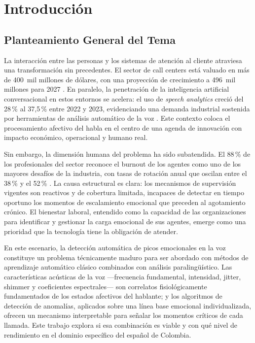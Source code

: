 \section{Introducción}
\label{sec:introduccion}

\subsection{Planteamiento General del Tema}
\label{sec:intro_planteamiento}

La interacción entre las personas y los sistemas de atención al cliente atraviesa una
transformación sin precedentes. El sector de call centers está valuado en más de
400~mil millones de dólares, con una proyección de crecimiento a 496~mil millones para
2027 \cite{zoom2025}. En paralelo, la penetración de la inteligencia artificial
conversacional en estos entornos se acelera: el uso de \textit{speech analytics}
creció del 28\,\% al 37{,}5\,\% entre 2022 y 2023, evidenciando una demanda industrial
sostenida por herramientas de análisis automático de la voz \cite{zoom2025}. Este
contexto coloca el procesamiento afectivo del habla en el centro de una agenda de
innovación con impacto económico, operacional y humano real.

Sin embargo, la dimensión humana del problema ha sido subatendida. El 88\,\% de los
profesionales del sector reconoce el burnout de los agentes como uno de los mayores
desafíos de la industria, con tasas de rotación anual que oscilan entre el 38\,\% y el
52\,\% \cite{sqm2023, hiringbranch2024}. La causa estructural es clara: los mecanismos
de supervisión vigentes son reactivos y de cobertura limitada, incapaces de detectar
en tiempo oportuno los momentos de escalamiento emocional que preceden al agotamiento
crónico. El bienestar laboral, entendido como la capacidad de las organizaciones para
identificar y gestionar la carga emocional de sus agentes, emerge como una prioridad
que la tecnología tiene la obligación de atender.

En este escenario, la detección automática de picos emocionales en la voz constituye
un problema técnicamente maduro para ser abordado con métodos de aprendizaje automático
clásico combinados con análisis paralingüístico. Las características acústicas de la
voz ---frecuencia fundamental, intensidad, jitter, shimmer y coeficientes espectrales---
son correlatos fisiológicamente fundamentados de los estados afectivos del hablante;
y los algoritmos de detección de anomalías, aplicados sobre una línea base emocional
individualizada, ofrecen un mecanismo interpretable para señalar los momentos críticos
de cada llamada. Este trabajo explora si esa combinación es viable y con qué nivel de
rendimiento en el dominio específico del español de Colombia.

